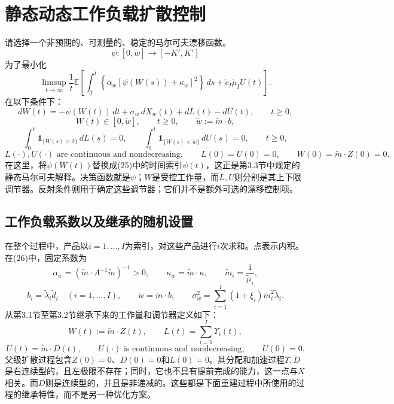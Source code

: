 \documentclass[11pt]{article}
\begin{document}
\section*{静态动态工作负载扩散控制}

请选择一个非预期的、可测量的、稳定的马尔可夫漂移函数。
\[
\psi:[0,\tilde w]\longrightarrow[-K',K']
\]
为了最小化
\begin{equation}
\limsup_{t\to\infty}\frac1t\mathbb E\left[
\int_0^t\left\{\alpha_w[\psi(W(s))+\kappa_w]^2\right\}\,ds
+\tilde c_I\tilde\mu_I U(t)\right].
\tag{26}
\end{equation}
在以下条件下：
\begin{equation}
dW(t)=-\psi(W(t))\,dt+\sigma_w\,dX_w(t)+dL(t)-dU(t),
\qquad t\geq0,
\tag{25}
\end{equation}
\begin{equation}
W(t)\in[0,\tilde w],\qquad t\geq0,
\qquad \tilde w:=\tilde m\cdot b,
\tag{16}
\end{equation}
\begin{equation}
\int_0^t\mathbf1_{\{W(s)>0\}}\,dL(s)=0,
\qquad
\int_0^t\mathbf1_{\{W(s)<\tilde w\}}\,dU(s)=0,
\qquad t\geq0,
\tag{18}
\end{equation}
\[
L(\cdot),U(\cdot)\text{ are continuous and nondecreasing},
\qquad L(0)=U(0)=0,
\qquad W(0)=\tilde m\cdot Z(0)=0.
\]
在这里，将\(\psi(W(t))\)替换成(25)中的时间索引\(\psi(t)\)，这正是第3.3节中规定的静态马尔可夫解释。决策函数就是\(\psi\)；\(W\)是受控工作量，而\(L,U\)则分别是其上下限调节器。反射条件则用于确定这些调节器；它们并不是额外可选的漂移控制项。

\subsection*{工作负载系数以及继承的随机设置}

在整个过程中，产品以\(i=1,\ldots,I\)为索引，对这些产品进行\(i\)次求和。点表示内积。在(26)中，固定系数为
\[
\alpha_w=(\tilde m\cdot A^{-1}\tilde m)^{-1}>0,
\qquad \kappa_w=\tilde m\cdot\kappa,
\qquad \tilde m_i=\frac1{\tilde\mu_i},
\]
\[
b_i=\tilde\lambda_i\tilde d_i\quad(i=1,\ldots,I),
\qquad
\tilde w=\tilde m\cdot b,
\qquad
\sigma_w^2=\sum_{i=1}^I(1+\xi_i)\tilde m_i^2\tilde\lambda_i.
\]
从第3.1节至第3.2节继承下来的工作量和调节器定义如下：
\[
W(t):=\tilde m\cdot Z(t),
\qquad L(t)=\sum_{i=1}^I\Upsilon_i(t),
\]
\begin{equation}
U(t)=\tilde m\cdot D(t),\qquad
U(\cdot)\text{ is continuous and nondecreasing},\qquad U(0)=0.
\tag{15}
\end{equation}
父级扩散过程包含\(Z(0)=0\)、\(D(0)=0\)和\(L(0)=0\)。其分配和加速过程\(\Upsilon,D\)是右连续型的，且左极限不存在；同时，它也不具有提前完成的能力，这一点与\(X\)相关。而\(D\)则是连续型的，并且是非递减的。这些都是下面重建过程中所使用的过程的继承特性，而不是另一种优化方案。
\end{document}
